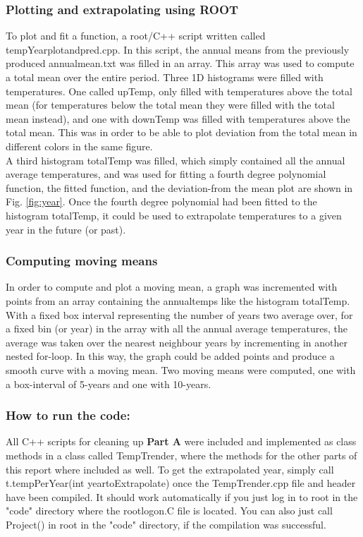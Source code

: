 \documentclass[a4paper]{article}
\begin{document}
\subsubsection{Plotting and extrapolating using ROOT}
To plot and fit a function, a root/C++ script written called tempYearplotandpred.cpp. In this script, the annual means from the previously produced annualmean.txt was filled in an array. This array was used to compute a total mean over the entire period. Three 1D histograms were filled with
temperatures. One called upTemp, only filled with temperatures above the total mean (for temperatures below the total mean they were filled with the total mean instead), and one with downTemp was filled with temperatures above the total mean. This was in order to be able to plot deviation from the total mean in different colors in the same figure.\\

A third histogram totalTemp was filled, which simply contained all the annual average temperatures, and was used for fitting a fourth degree polynomial function, the fitted function, and the deviation-from the mean plot are shown in Fig. \ref{fig:year}. Once the fourth degree polynomial had been fitted to the histogram totalTemp, it could be used to extrapolate temperatures to a given year in the future (or past).

\subsubsection{Computing moving means}
In order to compute and plot a moving mean, a graph was incremented with points from an array containing the annualtemps like the histogram totalTemp. With a fixed box interval representing the number of years two average over, for a fixed bin (or year) in the array with all the annual average temperatures, the average was taken over the nearest neighbour years by incrementing in another nested for-loop. In this way, the graph could be added points and produce a smooth curve with a moving mean. Two moving means were computed, one with a box-interval of 5-years and one with 10-years.

\subsubsection{How to run the code:}
All C++ scripts for cleaning up \textbf{Part A} were included and implemented as class methods in a class called TempTrender, where the methods for the other parts of this report where included as well. To get the extrapolated year, simply call t.tempPerYear(int yeartoExtrapolate) once the TempTrender.cpp file and header have been compiled. It should work automatically if you just log in to root in the "code" directory where the rootlogon.C file is located. You can also just call Project() in root in the "code" directory, if the compilation was successful. 
\end{document}
